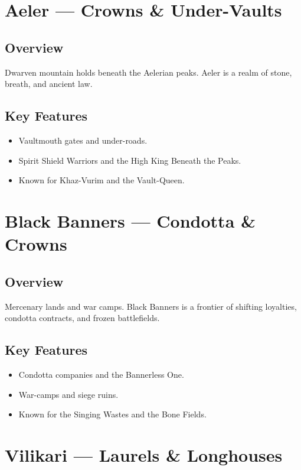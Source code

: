 \section{Aeler — Crowns \& Under-Vaults}
\label{sec:lore-aeler}

\subsection*{Overview}
Dwarven mountain holds beneath the Aelerian peaks. Aeler is a realm of stone, breath, and ancient law.

\subsection*{Key Features}
\begin{itemize}[leftmargin=*]
    \item Vaultmouth gates and under-roads.
    \item Spirit Shield Warriors and the High King Beneath the Peaks.
    \item Known for Khaz-Vurim and the Vault-Queen.
\end{itemize}

\section{Black Banners — Condotta \& Crowns}
\label{sec:lore-black-banners}

\subsection*{Overview}
Mercenary lands and war camps. Black Banners is a frontier of shifting loyalties, condotta contracts, and frozen battlefields.

\subsection*{Key Features}
\begin{itemize}[leftmargin=*]
    \item Condotta companies and the Bannerless One.
    \item War-camps and siege ruins.
    \item Known for the Singing Wastes and the Bone Fields.
\end{itemize}

\section{Vilikari — Laurels \& Longhouses}
\label{sec:lore-vilikari}

